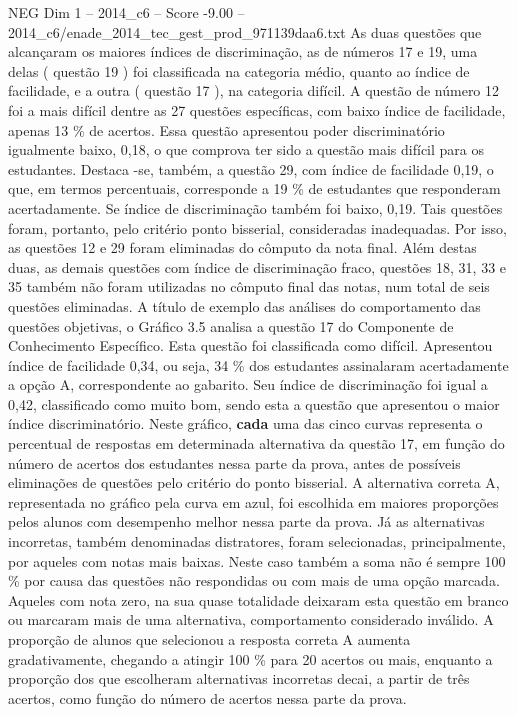 \begin{textsample}{NEG Dim 1 – 2014\_c6 – Score -9.00 – 2014\_c6/enade\_2014\_tec\_gest\_prod\_971139daa6.txt}
As duas questões que alcançaram os maiores índices de discriminação, as de números 17 e 19, uma delas ( questão 19 ) foi classificada na categoria médio, quanto ao índice de facilidade, e a outra ( questão 17 ), na categoria difícil.
A questão de número 12 foi a mais difícil dentre as 27 questões específicas, com baixo índice de facilidade, apenas 13 \% de acertos.
Essa questão apresentou poder discriminatório igualmente baixo, 0,18, o que comprova ter sido a questão mais difícil para os estudantes.
Destaca -se, também, a questão 29, com índice de facilidade 0,19, o que, em termos percentuais, corresponde a 19 \% de estudantes que responderam acertadamente.
Se índice de discriminação também foi baixo, 0,19.
Tais questões foram, portanto, pelo critério ponto bisserial, consideradas inadequadas.
Por isso, as questões 12 e 29 foram eliminadas do cômputo da nota final.
Além destas duas, as demais questões com índice de discriminação fraco, questões 18, 31, 33 e 35 também não foram utilizadas no cômputo final das notas, num total de seis questões eliminadas.
A título de exemplo das análises do comportamento das questões objetivas, o Gráfico 3.5 analisa a questão 17 do Componente de Conhecimento Específico.
Esta questão foi classificada como difícil.
Apresentou índice de facilidade 0,34, ou seja, 34 \% dos estudantes assinalaram acertadamente a opção A, correspondente ao gabarito.
Seu índice de discriminação foi igual a 0,42, classificado como muito bom, sendo esta a questão que apresentou o maior índice discriminatório.
Neste gráfico, \textbf{cada} uma das cinco curvas representa o percentual de respostas em determinada alternativa da questão 17, em função do número de acertos dos estudantes nessa parte da prova, antes de possíveis eliminações de questões pelo critério do ponto bisserial.
A alternativa correta A, representada no gráfico pela curva em azul, foi escolhida em maiores proporções pelos alunos com desempenho melhor nessa parte da prova.
Já as alternativas incorretas, também denominadas distratores, foram selecionadas, principalmente, por aqueles com notas mais baixas.
Neste caso também a soma não é sempre 100 \% por causa das questões não respondidas ou com mais de uma opção marcada.
Aqueles com nota zero, na sua quase totalidade deixaram esta questão em branco ou marcaram mais de uma alternativa, comportamento considerado inválido.
A proporção de alunos que selecionou a resposta correta A aumenta gradativamente, chegando a atingir 100 \% para 20 acertos ou mais, enquanto a proporção dos que escolheram alternativas incorretas decai, a partir de três acertos, como função do número de acertos nessa parte da prova.

\end{textsample}
